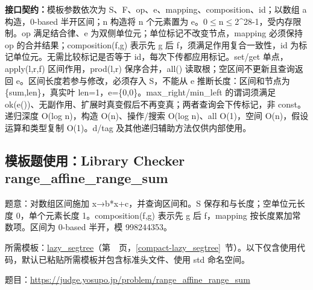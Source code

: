 {\sloppy{}\noindent\textbf{接口契约：}模板参数依次为 S、F、op、e、mapping、composition、id；以数组 a 构造，0-based 半开区间；n 构造将 n 个元素置为 e。0$\le$n$\le$2\textasciicircum{}28-1，受内存限制。op 满足结合律、e 为双侧单位元；单位标记不改变节点，mapping 必须保持 op 的合并结果；composition(f,g) 表示先 g 后 f，须满足作用复合一致性，id 为标记单位元。无需比较标记是否等于 id，每次下传都应用标记。set/get 单点，apply(l,r,f) 区间作用，prod(l,r) 保序合并，all() 读取根；空区间不更新且查询返回 e。区间长度若参与修改，必须存入 S，不能从 e 推断长度：区间和节点为 \{sum,len\}，真实叶 len=1，e=\{0,0\}。max\_right/min\_left 的谓词须满足 ok(e())、无副作用、扩展时真变假后不再变真；两者查询会下传标记，非 const。递归深度 O(log n)，构造 O(n)、操作/搜索 O(log n)、all O(1)，空间 O(n)，假设运算和类型复制 O(1)。d/tag 及其他递归辅助方法仅供内部使用。\par}

\Needspace{426pt}



\newpage



\newpage



\newpage



\Needspace{499pt}

\subsection*{模板题使用：Library Checker range\_affine\_range\_sum}

\label{usage-example-79}

题意：对数组区间施加 x→b*x+c，并查询区间和。S 保存和与长度；空单位元长度 0，单个元素长度 1。composition(f,g) 表示先 g 后 f，mapping 按长度累加常数项。区间为 0-based 半开，模 998244353。

所需模板：\hyperref[compact-lazy_segtree]{lazy\_\allowbreak{}segtree}（第~\pageref{compact-lazy_segtree}~页，\ref{compact-lazy_segtree}~节）。以下仅含使用代码，默认已粘贴所需模板并包含标准头文件、使用 std 命名空间。

题目：\url{https://judge.yosupo.jp/problem/range_affine_range_sum}

